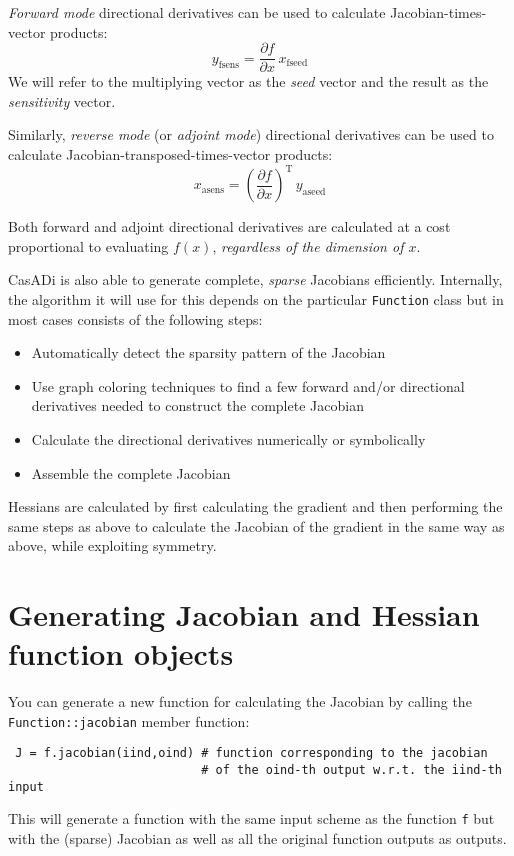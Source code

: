 \documentclass[a4paper,12pt]{book}
\begin{document}
\emph{Forward mode} directional derivatives can be used to calculate Jacobian-times-vector products:
\begin{equation}
 y_{\text{fsens}} = \frac{\partial f}{\partial x} \, x_{\text{fseed}}
\end{equation}
We will refer to the multiplying vector as the \emph{seed} vector and the result as the \emph{sensitivity} vector.

Similarly, \emph{reverse mode} (or \emph{adjoint mode}) directional derivatives can be used to calculate Jacobian-transposed-times-vector products:
\begin{equation}
 x_{\text{asens}} = \left(\frac{\partial f}{\partial x}\right)^{\text{T}} \, y_{\text{aseed}}
\end{equation}

Both forward and adjoint directional derivatives are calculated at a cost proportional to evaluating $f(x)$, \emph{regardless of the dimension of $x$}.

CasADi is also able to generate complete, \emph{sparse} Jacobians efficiently. Internally, the algorithm it will use for this depends on the particular \texttt{Function} class but in most cases consists of the following steps:
\begin{itemize}
 \item Automatically detect the sparsity pattern of the Jacobian
 \item Use graph coloring techniques to find a few forward and/or directional derivatives needed to construct the complete Jacobian
 \item Calculate the directional derivatives numerically or symbolically
 \item Assemble the complete Jacobian
\end{itemize}

Hessians are calculated by first calculating the gradient and then performing the same steps as above to calculate the Jacobian of the gradient in the same way as above, while exploiting symmetry.

\section{Generating Jacobian and Hessian function objects}
You can generate a new function for calculating the Jacobian by calling the \texttt{Function::jacobian} member function:
\begin{verbatim}
 J = f.jacobian(iind,oind) # function corresponding to the jacobian
                           # of the oind-th output w.r.t. the iind-th input
\end{verbatim}
This will generate a function with the same input scheme as the function \texttt{f} but with the (sparse) Jacobian as well as all the original function outputs as outputs.
\end{document}

